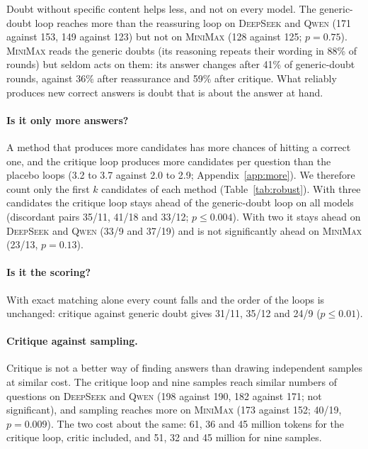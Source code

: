 \documentclass[11pt]{article}
\newcommand{\ds}{\textsc{DeepSeek}}
\newcommand{\qw}{\textsc{Qwen}}
\newcommand{\mm}{\textsc{MiniMax}}
\begin{document}
Doubt without specific content helps less, and not on every model.
The generic-doubt loop reaches more than the reassuring loop on \ds{} and \qw{} (171 against 153, 149 against 123) but not on \mm{} (128 against 125; $p=0.75$).
\mm{} reads the generic doubts (its reasoning repeats their wording in 88\% of rounds) but seldom acts on them: its answer changes after 41\% of generic-doubt rounds, against 36\% after reassurance and 59\% after critique.
What reliably produces new correct answers is doubt that is about the answer at hand.

\paragraph{Is it only more answers?}
A method that produces more candidates has more chances of hitting a correct one, and the critique loop produces more candidates per question than the placebo loops (3.2 to 3.7 against 2.0 to 2.9; Appendix~\ref{app:more}).
We therefore count only the first $k$ candidates of each method (Table~\ref{tab:robust}).
With three candidates the critique loop stays ahead of the generic-doubt loop on all models (discordant pairs 35/11, 41/18 and 33/12; $p\le 0.004$).
With two it stays ahead on \ds{} and \qw{} (33/9 and 37/19) and is not significantly ahead on \mm{} (23/13, $p=0.13$).

\paragraph{Is it the scoring?}
With exact matching alone every count falls and the order of the loops is unchanged: critique against generic doubt gives 31/11, 35/12 and 24/9 ($p\le 0.01$).

\paragraph{Critique against sampling.}
Critique is not a better way of finding answers than drawing independent samples at similar cost.
The critique loop and nine samples reach similar numbers of questions on \ds{} and \qw{} (198 against 190, 182 against 171; not significant), and sampling reaches more on \mm{} (173 against 152; 40/19, $p=0.009$).
The two cost about the same: 61, 36 and 45 million tokens for the critique loop, critic included, and 51, 32 and 45 million for nine samples.
\end{document}
